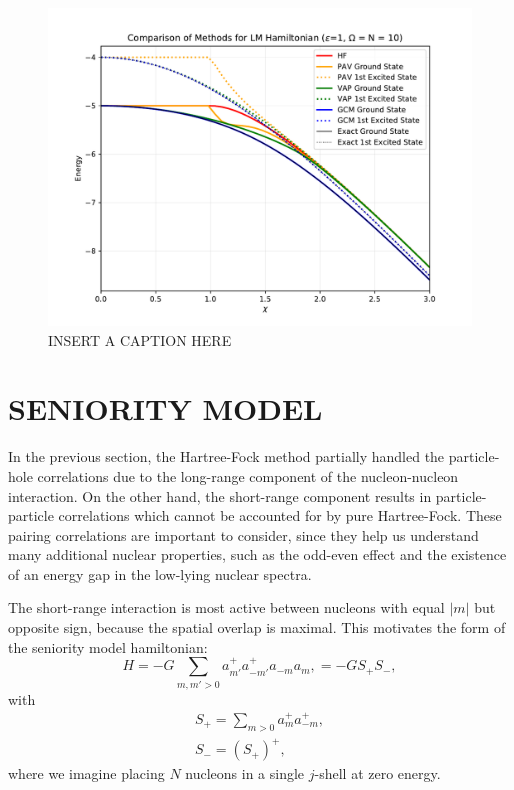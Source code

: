 \documentclass[prb,aps,twocolumn,showpacs,10pt]{revtex4-2}
\begin{document}
\begin{figure}
  \includegraphics[width=\textwidth]{../figures/plot_lipkin_energies.pdf}
  \caption{INSERT A CAPTION HERE}
\end{figure}

\section{SENIORITY MODEL}

In the previous section, the Hartree-Fock method partially handled the particle-hole correlations due to the long-range component of the nucleon-nucleon interaction. On the other hand, the short-range component results in particle-particle correlations which cannot be accounted for by pure Hartree-Fock. These pairing correlations are important to consider, since they help us understand many additional nuclear properties, such as the odd-even effect and the existence of an energy gap in the low-lying nuclear spectra.

The short-range interaction is most active between nucleons with equal $|m|$ but opposite sign, because the spatial overlap is maximal. This motivates the form of the seniority model hamiltonian:
\begin{equation}
H = -G \sum_{m,m'>0} a_{m'}^+ a_{-m'}^+ a_{-m} a_m,
= -GS_+ S_-,
\end{equation}
with 
\begin{align}
S_+ = \sum_{m>0} a_m^+ a_{-m}^+, \\
S_- = (S_+)^+,
\end{align}
where we imagine placing $N$ nucleons in a single $j$-shell at zero energy.
\end{document}
